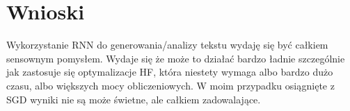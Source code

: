 \documentclass[11pt,leqno]{article}
\begin{document}
\section{Wnioski}
Wykorzystanie RNN do generowania/analizy tekstu wydaję się być całkiem sensownym pomysłem.
Wydaje się że może to działać bardzo ładnie szczególnie jak zastosuje się optymalizacje HF, która niestety wymaga albo bardzo dużo czasu, albo większych mocy obliczeniowych.
W moim przypadku osiągnięte z SGD wyniki nie są może świetne, ale całkiem zadowalające.
\end{document}
